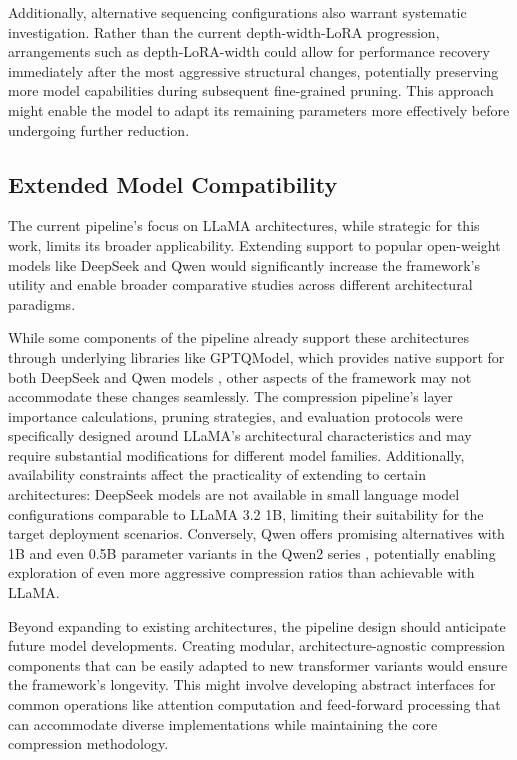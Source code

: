 Additionally, alternative sequencing configurations also warrant systematic investigation. Rather than the current depth-width-LoRA progression, arrangements such as depth-LoRA-width could allow for performance recovery immediately after the most aggressive structural changes, potentially preserving more model capabilities during subsequent fine-grained pruning. This approach might enable the model to adapt its remaining parameters more effectively before undergoing further reduction.


\subsection{Extended Model Compatibility}
The current pipeline's focus on LLaMA architectures, while strategic for this work, limits its broader applicability. Extending support to popular open-weight models like DeepSeek \cite{deepseek} and Qwen \cite{qwen} would significantly increase the framework's utility and enable broader comparative studies across different architectural paradigms.

While some components of the pipeline already support these architectures through underlying libraries like GPTQModel, which provides native support for both DeepSeek and Qwen models \cite{gptqmodel}, other aspects of the framework may not accommodate these changes seamlessly. The compression pipeline's layer importance calculations, pruning strategies, and evaluation protocols were specifically designed around LLaMA's architectural characteristics and may require substantial modifications for different model families. Additionally, availability constraints affect the practicality of extending to certain architectures: DeepSeek models are not available in small language model configurations comparable to LLaMA 3.2 1B, limiting their suitability for the target deployment scenarios. Conversely, Qwen offers promising alternatives with 1B and even 0.5B parameter variants in the Qwen2 series \cite{qwen2}, potentially enabling exploration of even more aggressive compression ratios than achievable with LLaMA.

Beyond expanding to existing architectures, the pipeline design should anticipate future model developments. Creating modular, architecture-agnostic compression components that can be easily adapted to new transformer variants would ensure the framework's longevity. This might involve developing abstract interfaces for common operations like attention computation and feed-forward processing that can accommodate diverse implementations while maintaining the core compression methodology.

